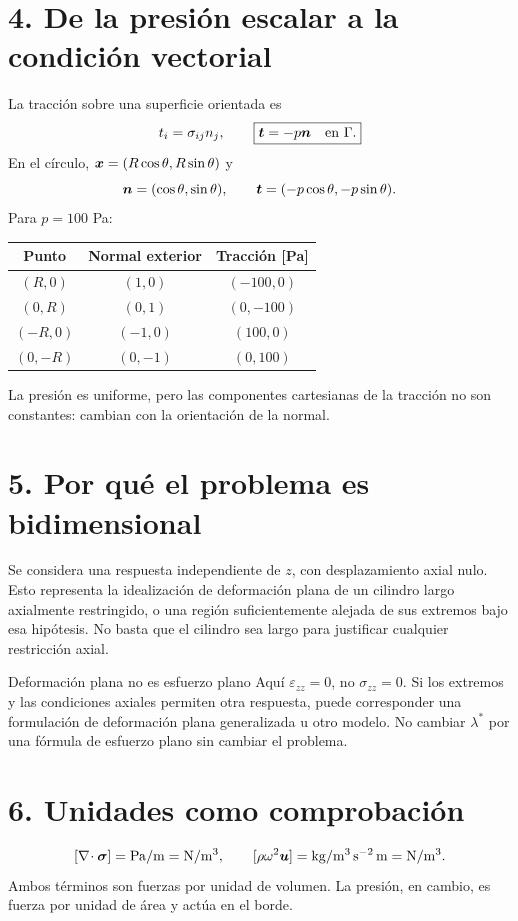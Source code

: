 \documentclass[11pt]{article}
\begin{document}
\newpage
\section*{4. De la presión escalar a la condición vectorial}
La tracción sobre una superficie orientada es
\[
 t_i=\sigma_{ij}n_j,\qquad \boxed{\bm{t}=-p\bm{n}\quad\text{en }\Gamma.}
\]
En el círculo, \(\bm{x}=(R\cos\theta,R\sin\theta)\) y
\[
 \bm{n}=(\cos\theta,\sin\theta),\qquad
 \bm{t}=(-p\cos\theta,-p\sin\theta).
\]
Para \(p=100\) Pa:
\begin{center}
\begin{tabular}{ccc}
\toprule
Punto & Normal exterior & Tracción [Pa]\\
\midrule
\((R,0)\)&\((1,0)\)&\((-100,0)\)\\
\((0,R)\)&\((0,1)\)&\((0,-100)\)\\
\((-R,0)\)&\((-1,0)\)&\((100,0)\)\\
\((0,-R)\)&\((0,-1)\)&\((0,100)\)\\
\bottomrule
\end{tabular}
\end{center}
La presión es uniforme, pero las componentes cartesianas de la tracción no
son constantes: cambian con la orientación de la normal.

\section*{5. Por qué el problema es bidimensional}
Se considera una respuesta independiente de \(z\), con desplazamiento axial
nulo. Esto representa la idealización de deformación plana de un cilindro
largo axialmente restringido, o una región suficientemente alejada de sus
extremos bajo esa hipótesis. No basta que el cilindro sea largo para
justificar cualquier restricción axial.

\begin{alerta}{Deformación plana no es esfuerzo plano}
Aquí \(\varepsilon_{zz}=0\), no \(\sigma_{zz}=0\). Si los extremos y las
condiciones axiales permiten otra respuesta, puede corresponder una
formulación de deformación plana generalizada u otro modelo. No cambiar
\(\lambda^*\) por una fórmula de esfuerzo plano sin cambiar el problema.
\end{alerta}

\section*{6. Unidades como comprobación}
\[
 [\nabla\!\cdot\boldsymbol\sigma]=\mathrm{Pa/m}
 =\mathrm{N/m^3},\qquad
 [\rho\omega^2\bm{u}]=\mathrm{kg/m^3}\,\mathrm{s^{-2}}\,\mathrm m
 =\mathrm{N/m^3}.
\]
Ambos términos son fuerzas por unidad de volumen. La presión, en cambio,
es fuerza por unidad de área y actúa en el borde.
\end{document}
